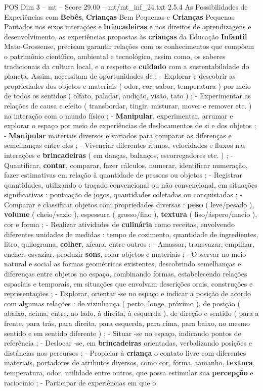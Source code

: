 \begin{textsample}{POS Dim 3 – mt – Score 29.00 – mt/mt\_inf\_24.txt}  \label{ex:f3_pos_075}
2.5.4 As Possibilidades de Experiências com \textbf{Bebês}, \textbf{Crianças} Bem Pequenas e \textbf{Crianças} Pequenas Pautados nos eixos interações e \textbf{brincadeiras} e nos direitos de aprendizagens e desenvolvimento, as experiências propostas às \textbf{crianças} da Educação \textbf{Infantil} Mato-Grossense, precisam garantir relações com os conhecimentos que compõem o patrimônio científico, ambiental e tecnológico, assim como, os saberes tradicionais da cultura local, e o respeito e \textbf{cuidado} com a sustentabilidade do planeta.
Assim, necessitam de oportunidades de : - Explorar e descobrir as propriedades dos objetos e materiais ( odor, cor, sabor, temperatura ) por meio de todos os sentidos ( olfato, paladar, audição, visão, tato ) ; - Experimentar as relações de causa e efeito ( transbordar, tingir, misturar, mover e remover etc. ) na interação com o mundo físico ; - \textbf{Manipular}, experimentar, arrumar e explorar o espaço por meio de experiências de deslocamentos de si e dos objetos ; - \textbf{Manipular} materiais diversos e variados para comparar as diferenças e semelhanças entre eles ; - Vivenciar diferentes ritmos, velocidades e fluxos nas interações e \textbf{brincadeiras} ( em danças, balanços, escorregadores etc. ) ; - Quantificar, \textbf{contar}, comparar, fazer cálculos, numerar, identificar numeração, fazer estimativas em relação à quantidade de pessoas ou objetos ; - Registrar quantidades, utilizando o traçado convencional ou não convencional, em situações significativas : pontuação de jogos, quantidades coletadas ou conquistadas ; - Comparar e classificar objetos com propriedades diversas : \textbf{peso} ( leve/pesado ), \textbf{volume} ( cheio/vazio ), espessura ( grosso/fino ), \textbf{textura} ( liso/áspero/macio ), cor e forma ; - Realizar atividades de \textbf{culinária} como receitas, envolvendo diferentes unidades de medidas : tempo de cozimento, quantidade de ingredientes, litro, quilograma, \textbf{colher}, xícara, entre outros ; - Amassar, transvazar, empilhar, encher, esvaziar, produzir \textbf{sons}, rolar objetos e materiais ; - Observar no meio natural e social as formas geométricas existentes, descobrindo semelhanças e diferenças entre objetos no espaço, combinando formas, estabelecendo relações espaciais e temporais, em situações que envolvam descrições orais, construções e representações ; - Explorar, orientar -se no espaço e indicar a posição de acordo com algumas relações : de vizinhança ( perto, longe, próximo ), de posição ( abaixo, acima, entre, ao lado, à direita, à esquerda ), de direção e sentido ( para a frente, para trás, para direita, para esquerda, para cima, para baixo, no mesmo sentido e em sentido diferente ) ; - Situar -se no espaço, indicando pontos de referência ; - Deslocar -se, em \textbf{brincadeiras} orientadas, verbalizando posições e distâncias nos percursos ; - Propiciar à \textbf{criança} o contato livre com diferentes materiais, portadores de atributos diversos, como cor, forma, tamanho, \textbf{textura}, temperatura, odor, utilidade entre outros, que possa estimular sua \textbf{percepção} e raciocínio ; - Participar de experiências em que o 
\end{textsample}
